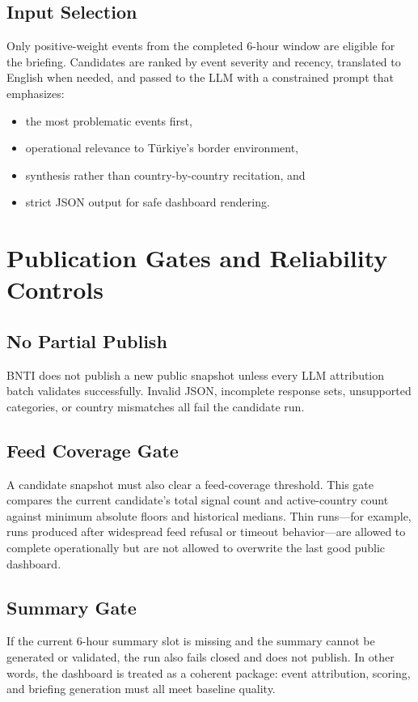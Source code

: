 \documentclass[11pt, a4paper]{article}
\begin{document}
\subsection{Input Selection}
Only positive-weight events from the completed 6-hour window are eligible for the briefing. Candidates are ranked by event severity and recency, translated to English when needed, and passed to the LLM with a constrained prompt that emphasizes:
\begin{itemize}
    \item the most problematic events first,
    \item operational relevance to Türkiye's border environment,
    \item synthesis rather than country-by-country recitation, and
    \item strict JSON output for safe dashboard rendering.
\end{itemize}

\section{Publication Gates and Reliability Controls}

\subsection{No Partial Publish}
BNTI does not publish a new public snapshot unless every LLM attribution batch validates successfully. Invalid JSON, incomplete response sets, unsupported categories, or country mismatches all fail the candidate run.

\subsection{Feed Coverage Gate}
A candidate snapshot must also clear a feed-coverage threshold. This gate compares the current candidate's total signal count and active-country count against minimum absolute floors and historical medians. Thin runs---for example, runs produced after widespread feed refusal or timeout behavior---are allowed to complete operationally but are not allowed to overwrite the last good public dashboard.

\subsection{Summary Gate}
If the current 6-hour summary slot is missing and the summary cannot be generated or validated, the run also fails closed and does not publish. In other words, the dashboard is treated as a coherent package: event attribution, scoring, and briefing generation must all meet baseline quality.
\end{document}

